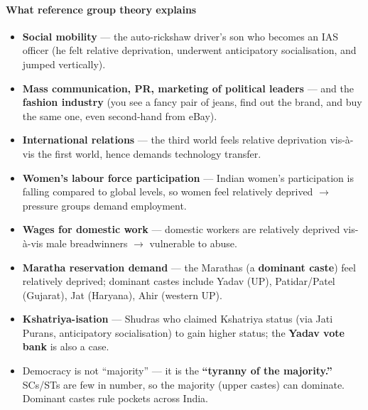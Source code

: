 \paragraph{What reference group theory explains}

\begin{DataFact}
\begin{itemize}
\item \textbf{Social mobility} --- the auto-rickshaw driver's son who becomes an IAS officer (he felt relative deprivation, underwent anticipatory socialisation, and jumped vertically).
\item \textbf{Mass communication, PR, marketing of political leaders} --- and the \textbf{fashion industry} (you see a fancy pair of jeans, find out the brand, and buy the same one, even second-hand from eBay).
\item \textbf{International relations} --- the third world feels relative deprivation vis-à-vis the first world, hence demands technology transfer.
\item \textbf{Women's labour force participation} --- Indian women's participation is falling compared to global levels, so women feel relatively deprived $\rightarrow$ pressure groups demand employment.
\item \textbf{Wages for domestic work} --- domestic workers are relatively deprived vis-à-vis male breadwinners $\rightarrow$ vulnerable to abuse.
\item \textbf{Maratha reservation demand} --- the Marathas (a \textbf{dominant caste}) feel relatively deprived; dominant castes include Yadav (UP), Patidar/Patel (Gujarat), Jat (Haryana), Ahir (western UP).
\item \textbf{Kshatriya-isation} --- Shudras who claimed Kshatriya status (via Jati Purans, anticipatory socialisation) to gain higher status; the \textbf{Yadav vote bank} is also a case.
\end{itemize}
\end{DataFact}

\begin{CriticalPoint}
\begin{itemize}
\item Democracy is not ``majority'' --- it is the \textbf{``tyranny of the majority.''} SCs/STs are few in number, so the majority (upper castes) can dominate. Dominant castes rule pockets across India.
\end{itemize}
\end{CriticalPoint}

